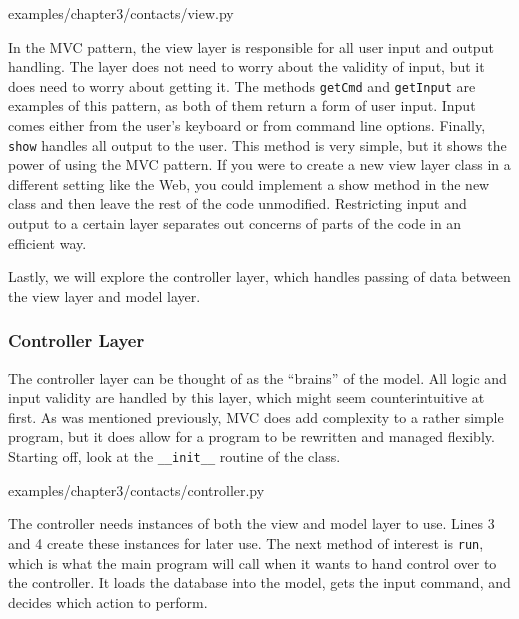 \documentclass[12pt, oneside, a4paper]{book}
\begin{document}
      
      {examples/chapter3/contacts/view.py}

      In the MVC pattern, the view layer is responsible for all user input and output handling.
      The layer does not need to worry about the validity of input, but it does need to worry about getting it.
      The methods \lstinline!getCmd! and \lstinline!getInput! are examples of this pattern, as both of them return a form of user input.
      Input comes either from the user's keyboard or from command line options.
      Finally, \lstinline!show! handles all output to the user.
      This method is very simple, but it shows the power of using the MVC pattern.
      If you were to create a new view layer class in a different setting like the Web, you could implement a show method in the new class and then leave the rest of the code unmodified.
      Restricting input and output to a certain layer separates out concerns of parts of the code in an efficient way.

      Lastly, we will explore the controller layer, which handles passing of data between the view layer and model layer.

      \subsubsection{Controller Layer}
      The controller layer can be thought of as the ``brains'' of the model.
      All logic and input validity are handled by this layer, which might seem counterintuitive at first.
      As was mentioned previously, MVC does add complexity to a rather simple program, but it does allow for a program to be rewritten and managed flexibly.
      Starting off, look at the \lstinline!__init__! routine of the class.
      
      
      {examples/chapter3/contacts/controller.py}

      The controller needs instances of both the view and model layer to use.
      Lines 3 and 4 create these instances for later use.
      The next method of interest is \lstinline!run!, which is what the main program will call when it wants to hand control over to the controller.
      It loads the database into the model, gets the input command, and decides which action to perform.
\end{document}
